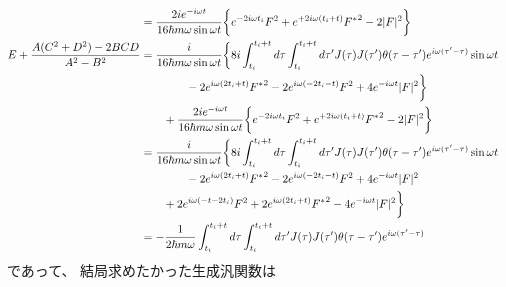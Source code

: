\begin{align}
\notag\\&
    =
    \dfrac{
        2 i
        e^{- i \omega t}
    }{16 \hbar m \omega \sin \omega t}
    \bigg\{
        e^{- 2 i \omega t_i}
            F^2
    +
        e^{+ 2 i \omega (t_i + t)}
            {F^*}^2
    - 2
        | F |^2
    \bigg\}
\notag\\
    E
    +
    \dfrac{
        A ( C^2 + D^2 )
    -
        2 BCD
    }{
        A^2 - B^2
    }
&=
    \dfrac{i}{16 \hbar m \omega \sin \omega t}
    \bigg\{
    8 i
    \int_{t_i}^{t_i + t}
        d\tau
    \int_{t_i}^{t_i + t}
        d\tau'
    J(\tau) J(\tau')
    \theta(\tau - \tau')
        e^{ i \omega (\tau' - \tau) }
    \sin \omega t
\notag\\&\qquad\qquad
    -
    2
        e^{ i \omega (2 t_i + t) }
            { F^* }^2
    - 2
        e^{ i \omega ( - 2 t_i - t) }
            F^2
    + 4
        e^{ - i \omega t }
            | F |^2
    \bigg\}
\notag\\&\qquad
        +
        \dfrac{
            2 i
            e^{- i \omega t}
        }{16 \hbar m \omega \sin \omega t}
        \bigg\{
            e^{- 2 i \omega t_i}
                F^2
        +
            e^{+ 2 i \omega (t_i + t)}
                {F^*}^2
        - 2
        | F |^2
    \bigg\}
\notag\\&
    =
    \dfrac{i}{16 \hbar m \omega \sin \omega t}
    \bigg\{
    8 i
    \int_{t_i}^{t_i + t}
        d\tau
    \int_{t_i}^{t_i + t}
        d\tau'
    J(\tau) J(\tau')
    \theta(\tau - \tau')
        e^{ i \omega (\tau' - \tau) }
    \sin \omega t
\notag\\&\qquad\qquad
    -
    2
        e^{ i \omega (2 t_i + t) }
            { F^* }^2
    - 2
        e^{ i \omega ( - 2 t_i - t) }
            F^2
    + 4
        e^{ - i \omega t }
            | F |^2
\notag\\&\qquad
        +
            2
            e^{i \omega (- t - 2 t_i)}
                F^2
        +
            2
            e^{i \omega (2 t_i + t)}
                {F^*}^2
        - 4
            e^{- i \omega t}
                | F |^2
    \bigg\}
\notag\\&
    =
    -
    \dfrac{1}{2 \hbar m \omega}
    \int_{t_i}^{t_i + t}
        d\tau
    \int_{t_i}^{t_i + t}
        d\tau'
    J(\tau) J(\tau')
    \theta(\tau - \tau')
        e^{ i \omega (\tau' - \tau) }
\end{align}
であって、
結局求めたかった生成汎関数は

